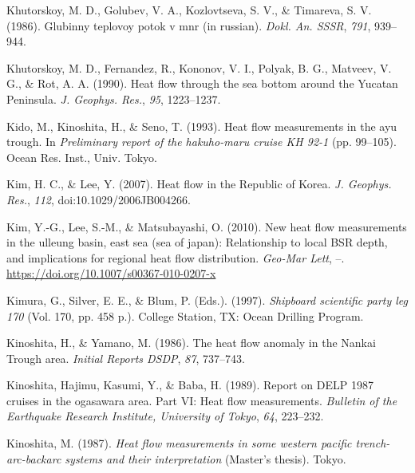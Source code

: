 \documentclass[draft,linenumbers]{agujournal2018}
\begin{document}
\leavevmode{}%
Khutorskoy, M. D., Golubev, V. A., Kozlovtseva, S. V., \& Timareva, S.
V. (1986). Glubinny teplovoy potok v mnr (in russian). \emph{Dokl. An.
SSSR}, \emph{791}, 939--944.

\leavevmode{}%
Khutorskoy, M. D., Fernandez, R., Kononov, V. I., Polyak, B. G.,
Matveev, V. G., \& Rot, A. A. (1990). Heat flow through the sea bottom
around the {Yucatan Peninsula}. \emph{J. Geophys. Res.}, \emph{95},
1223--1237.

\leavevmode{}%
Kido, M., Kinoshita, H., \& Seno, T. (1993). Heat flow measurements in
the ayu trough. In \emph{Preliminary report of the hakuho-maru cruise KH
92-1} (pp. 99--105). Ocean Res. Inst., Univ. Tokyo.

\leavevmode{}%
Kim, H. C., \& Lee, Y. (2007). Heat flow in the {Republic of Korea}.
\emph{J. Geophys. Res.}, \emph{112}, doi:10.1029/2006JB004266.

\leavevmode{}%
Kim, Y.-G., Lee, S.-M., \& Matsubayashi, O. (2010). New heat flow
measurements in the ulleung basin, east sea (sea of japan): Relationship
to local BSR depth, and implications for regional heat flow
distribution. \emph{Geo-Mar Lett}, --.
\url{https://doi.org/10.1007/s00367-010-0207-x}

\leavevmode{}%
Kimura, G., Silver, E. E., \& Blum, P. (Eds.). (1997). \emph{Shipboard
scientific party leg 170} (Vol. 170, pp. 458 p.). College Station, TX:
Ocean Drilling Program.

\leavevmode{}%
Kinoshita, H., \& Yamano, M. (1986). The heat flow anomaly in the
{Nankai Trough} area. \emph{Initial Reports DSDP}, \emph{87}, 737--743.

\leavevmode{}%
Kinoshita, Hajimu, Kasumi, Y., \& Baba, H. (1989). Report on DELP 1987
cruises in the ogasawara area. Part VI: Heat flow measurements.
\emph{Bulletin of the Earthquake Research Institute, University of
Tokyo}, \emph{64}, 223--232.

\leavevmode{}%
Kinoshita, M. (1987). \emph{Heat flow measurements in some western
pacific trench-arc-backarc systems and their interpretation} (Master's
thesis). Tokyo.
\end{document}
